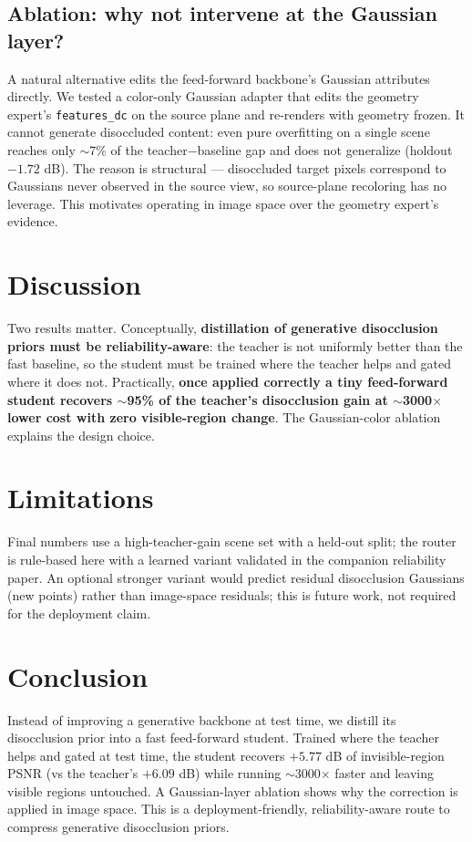 \documentclass[10pt,twocolumn,letterpaper]{article}
\begin{document}
\subsection{Ablation: why not intervene at the Gaussian layer?}
A natural alternative edits the feed-forward backbone's Gaussian attributes
directly. We tested a color-only Gaussian adapter that edits the geometry
expert's \texttt{features\_dc} on the source plane and re-renders with geometry
frozen. It cannot generate disoccluded content: even pure overfitting on a single
scene reaches only $\sim$7\% of the teacher$-$baseline gap and does not
generalize (holdout $-1.72$ dB). The reason is structural --- disoccluded target
pixels correspond to Gaussians never observed in the source view, so source-plane
recoloring has no leverage. This motivates operating in image space over the
geometry expert's evidence.

\section{Discussion}
\label{sec:disc}
Two results matter. Conceptually, \textbf{distillation of generative disocclusion
priors must be reliability-aware}: the teacher is not uniformly better than the
fast baseline, so the student must be trained where the teacher helps and gated
where it does not. Practically, \textbf{once applied correctly a tiny
feed-forward student recovers $\sim$95\% of the teacher's disocclusion gain at
$\sim$3000$\times$ lower cost with zero visible-region change}. The Gaussian-color
ablation explains the design choice.

\section{Limitations}
\label{sec:limits}
Final numbers use a high-teacher-gain scene set with a held-out split; the router
is rule-based here with a learned variant validated in the companion reliability
paper. An optional stronger variant would predict residual disocclusion Gaussians
(new points) rather than image-space residuals; this is future work, not required
for the deployment claim.

\section{Conclusion}
\label{sec:concl}
Instead of improving a generative backbone at test time, we distill its
disocclusion prior into a fast feed-forward student. Trained where the teacher
helps and gated at test time, the student recovers $+5.77$ dB of invisible-region
PSNR (vs the teacher's $+6.09$ dB) while running $\sim$3000$\times$ faster and
leaving visible regions untouched. A Gaussian-layer ablation shows why the
correction is applied in image space. This is a deployment-friendly,
reliability-aware route to compress generative disocclusion priors.

{\small


}
\end{document}
